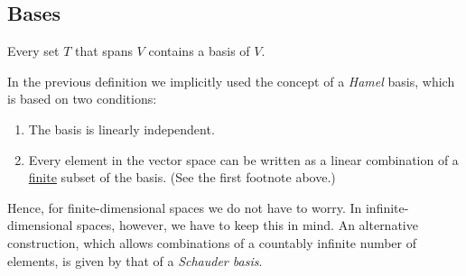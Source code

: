 

\subsection{Bases}

    \begin{property}
        Every set $T$ that spans $V$ contains a basis of $V$.
    \end{property}

    \begin{remark}
        In the previous definition we implicitly used the concept of a \textit{Hamel} basis, which is based on two conditions:
        \begin{enumerate}
            \item The basis is linearly independent.
            \item Every element in the vector space can be written as a linear combination of a \underline{finite} subset of the basis. (See the first footnote above.)
        \end{enumerate}
        Hence, for finite-dimensional spaces we do not have to worry. In infinite-dimensional spaces, however, we have to keep this in mind. An alternative construction, which allows combinations of a countably infinite number of elements, is given by that of a \textit{Schauder basis}.
    \end{remark}

